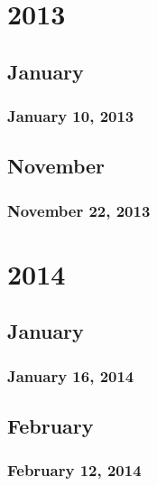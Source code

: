 \part{2013}
\chapter{January}
\section{January 10, 2013}


\chapter{November}
\section{November 22, 2013}

\part{2014}
\chapter{January}
\section{January 16, 2014}



\chapter{February}
\section{February 12, 2014}

